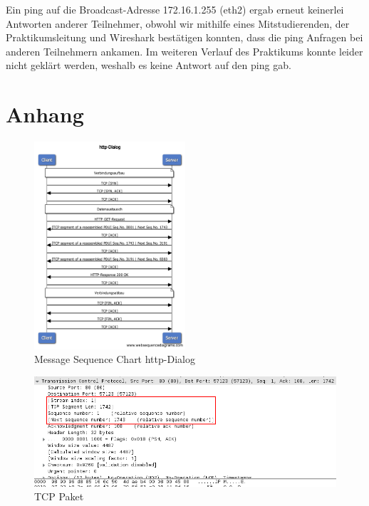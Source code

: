 \documentclass[paper=a4, fontsize=11pt]{scrreprt}
\numberwithin{equation}{section}
\numberwithin{figure}{section}
\numberwithin{table}{section}
\begin{document}
Ein ping auf die Broadcast-Adresse 172.16.1.255 (eth2) ergab erneut keinerlei Antworten anderer Teilnehmer, obwohl wir mithilfe eines Mitstudierenden, der Praktikumsleitung und Wireshark bestätigen konnten, dass die ping Anfragen bei anderen Teilnehmern ankamen. Im weiteren Verlauf des Praktikums konnte leider nicht geklärt werden, weshalb es keine Antwort auf den ping gab.

\newpage

\section{Anhang}

\begin{figure}[!htb] 
  \centering
     \includegraphics[width=0.5\textwidth]{resources/http-Dialog.png}
  \caption{Message Sequence Chart http-Dialog}
  \label{fig:http-dialog}
\end{figure}

\begin{figure}[!htb] 
  \centering
     \includegraphics[width=1.0\textwidth]{resources/tcp-package.png}
  \caption{TCP Paket}
  \label{fig:tcp-package}
\end{figure}
\end{document}
